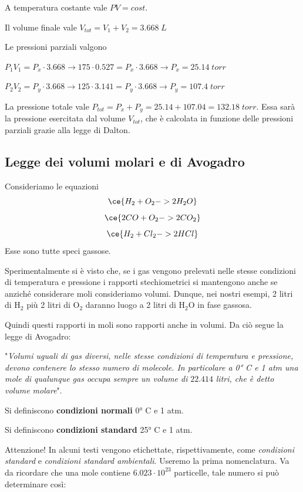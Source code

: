 \vspace{0.4cm}A temperatura costante vale $PV=cost$.

Il volume finale vale $V_{tot}=V_1 + V_2 =3.668 \; L$

Le pressioni parziali valgono

\vspace{0.2cm}$P_1V_1=P_x \cdot 3.668 \rightarrow 175 \cdot 0.527 = P_x \cdot 3.668 \rightarrow P_x = 25.14 \; torr$

\vspace{0.2cm}$P_2V_2=P_y \cdot 3.668 \rightarrow 125 \cdot 3.141 = P_y \cdot 3.668 \rightarrow P_y = 107.4 \; torr$

\vspace{0.2cm}La pressione totale vale $P_{tot}=P_x + P_y=25.14 + 107.04=132.18 \; torr$. Essa sarà la pressione esercitata dal volume $V_{tot}$, che è calcolata in funzione delle pressioni parziali grazie alla legge di Dalton.
\subsection{Legge dei volumi molari e di Avogadro}
Consideriamo le equazioni
$$\ce{H_2 + O_2 -> 2H_2O}$$
$$\ce{2CO + O_2 -> 2CO_2}$$
$$\ce{H_2 + Cl_2 -> 2HCl}$$
Esse sono tutte speci gassose.

Sperimentalmente si è visto che, se i gas vengono prelevati nelle stesse condizioni di temperatura e pressione i rapporti stechiometrici si mantengono anche se anziché considerare moli consideriamo volumi. Dunque, nei nostri esempi, 2 litri di H$_2$ più 2 litri di O$_2$ daranno luogo a 2 litri di H$_2$O in fase gassosa.

Quindi questi rapporti in moli sono rapporti anche in volumi. Da ciò segue la legge di Avogadro:

\vspace{0.2cm}"\textit{Volumi uguali di gas diversi, nelle stesse condizioni di temperatura e pressione, devono contenere lo stesso numero di molecole. In particolare a 0° C e 1 atm una mole di qualunque gas occupa sempre un volume di} $22.414$ \textit{litri, che è detto volume molare}".

\vspace{0.2cm}Si definiscono \textbf{condizioni normali} 0° C e 1 atm.

\vspace{0.2cm}Si definiscono \textbf{condizioni standard} 25° C e 1 atm.

\vspace{0.2cm}Attenzione! In alcuni testi vengono etichettate, rispettivamente, come \textit{condizioni standard} e \textit{condizioni standard ambientali}. Useremo la prima nomenclatura.
Va da ricordare che una mole contiene $6.023 \cdot 10^{23}$ particelle, tale numero si può determinare così:

